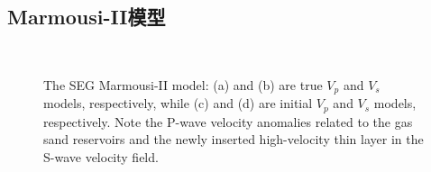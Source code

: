 \subsection{Marmousi-II模型}
\begin{figure}
    \begin{center}
		\\
        \caption{
            The SEG Marmousi-II model: (a) and (b) are true $V_p$ and $V_s$ models, respectively,
            while (c) and (d) are initial $V_p$ and $V_s$ models, respectively.
            Note the P-wave velocity
            anomalies related to the gas sand reservoirs and the newly inserted high-velocity
            thin layer in the S-wave velocity field.
    }
    \label{fig:MarInitTrue}
    \end{center}
\end{figure}
